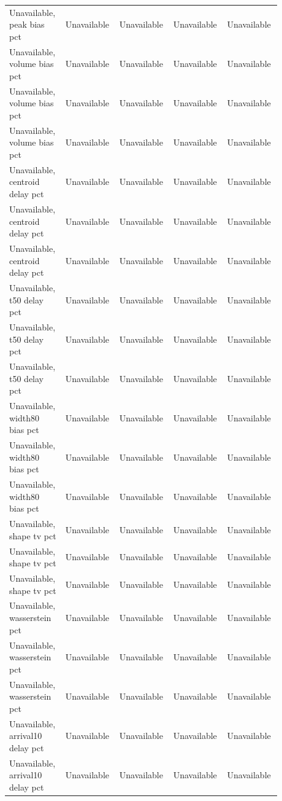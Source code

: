 \begin{longtable}{p{0.1760\linewidth}p{0.1760\linewidth}p{0.1760\linewidth}p{0.1760\linewidth}p{0.1760\linewidth}}
Unavailable, peak bias pct & Unavailable & Unavailable & Unavailable & Unavailable \\
Unavailable, volume bias pct & Unavailable & Unavailable & Unavailable & Unavailable \\
Unavailable, volume bias pct & Unavailable & Unavailable & Unavailable & Unavailable \\
Unavailable, volume bias pct & Unavailable & Unavailable & Unavailable & Unavailable \\
Unavailable, centroid delay pct & Unavailable & Unavailable & Unavailable & Unavailable \\
Unavailable, centroid delay pct & Unavailable & Unavailable & Unavailable & Unavailable \\
Unavailable, centroid delay pct & Unavailable & Unavailable & Unavailable & Unavailable \\
Unavailable, t50 delay pct & Unavailable & Unavailable & Unavailable & Unavailable \\
Unavailable, t50 delay pct & Unavailable & Unavailable & Unavailable & Unavailable \\
Unavailable, t50 delay pct & Unavailable & Unavailable & Unavailable & Unavailable \\
Unavailable, width80 bias pct & Unavailable & Unavailable & Unavailable & Unavailable \\
Unavailable, width80 bias pct & Unavailable & Unavailable & Unavailable & Unavailable \\
Unavailable, width80 bias pct & Unavailable & Unavailable & Unavailable & Unavailable \\
Unavailable, shape tv pct & Unavailable & Unavailable & Unavailable & Unavailable \\
Unavailable, shape tv pct & Unavailable & Unavailable & Unavailable & Unavailable \\
Unavailable, shape tv pct & Unavailable & Unavailable & Unavailable & Unavailable \\
Unavailable, wasserstein pct & Unavailable & Unavailable & Unavailable & Unavailable \\
Unavailable, wasserstein pct & Unavailable & Unavailable & Unavailable & Unavailable \\
Unavailable, wasserstein pct & Unavailable & Unavailable & Unavailable & Unavailable \\
Unavailable, arrival10 delay pct & Unavailable & Unavailable & Unavailable & Unavailable \\
Unavailable, arrival10 delay pct & Unavailable & Unavailable & Unavailable & Unavailable \\

\end{longtable}
